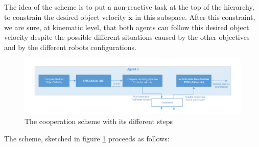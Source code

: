 The idea of the scheme is to put a non-reactive task at the top of the hierarchy, to constrain the desired object velocity $\boldsymbol{\dot{\tilde{x}}}$ in this subspace. After this constraint, we are sure, at kinematic level, that both agents can follow this desired object velocity despite the possible different situations caused by the other objectives and by the different robots configurations.\\
\begin{figure}[H]
	\centering
	\centerline{
		\includegraphics[width=1.2\columnwidth]{coopScheme.png} }
	\caption{The cooperation scheme with its different steps}
	\label{fig:coopScheme}
\end{figure}
The scheme, sketched in figure \ref{fig:coopScheme} proceeds as follows:
